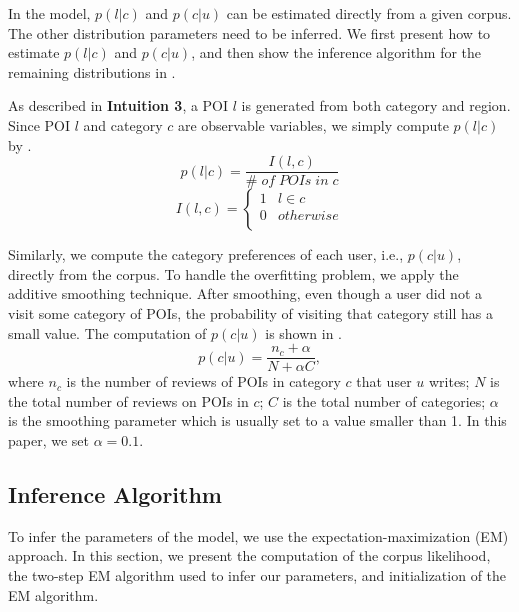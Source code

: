 In the model, $p(l|c)$ and
$p(c|u)$ can be estimated directly from a given corpus. The
other distribution parameters need to be inferred.
We first present how to estimate $p(l|c)$ and
$p(c|u)$, and then show the inference algorithm for
the remaining distributions in .

As described in \textbf{Intuition 3},
a POI $l$ is generated from both category
and region. Since POI $l$ and category $c$ are
observable variables, we simply compute $p(l|c)$
by .
\begin{equation}
p(l|c)=\frac{I(l,c)}{\#\; of\; POIs\; in\; c}
\label{eq:plc}
\end{equation}
\begin{equation}
I(l,c)=
\begin{cases}
1 & l\in c \\
0 & otherwise \\
\end{cases}
\end{equation}

Similarly, we compute the category preferences of each user, i.e., $p(c|u)$,
directly from the corpus. To handle the overfitting problem,
we apply the additive smoothing technique. After smoothing, even though a user did
not a visit some category of POIs, the probability of
visiting that category still has a small value. The computation of $p(c|u)$ is shown in
.
\begin{equation}
p(c|u)=\frac{n_c+\alpha}{N+{\alpha}C},
\label{eq:pcu}
\end{equation}
where $n_c$ is the number of reviews of POIs in category $c$ that user $u$
writes; $N$ is the total number of reviews on POIs in $c$; $C$
is the total number of categories; $\alpha$  is the smoothing
parameter which is usually set to a value smaller than 1. In this paper,
we set $\alpha=0.1$.

\subsection{Inference Algorithm}
\label{sec:infer}
To infer the parameters of the model, we
use the expectation-maximization (EM) approach.
In this section,
we present the computation of the corpus
likelihood, the two-step EM algorithm
used to infer our parameters, and
initialization of the EM algorithm.

